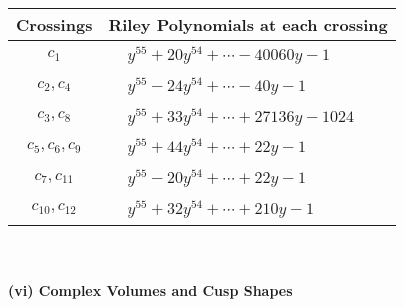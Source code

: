 \documentclass[1p]{elsarticle_modified}
\theoremstyle{definition}
\begin{document}
\begin{tabular}{m{50pt}|m{274pt}}
Crossings & \hspace{64pt}Riley Polynomials at each crossing \\
\hline $$\begin{aligned}c_{1}\end{aligned}$$&$\begin{aligned}
&y^{55}+20 y^{54}+\cdots-40060 y-1
\end{aligned}$\\
\hline $$\begin{aligned}c_{2},c_{4}\end{aligned}$$&$\begin{aligned}
&y^{55}-24 y^{54}+\cdots-40 y-1
\end{aligned}$\\
\hline $$\begin{aligned}c_{3},c_{8}\end{aligned}$$&$\begin{aligned}
&y^{55}+33 y^{54}+\cdots+27136 y-1024
\end{aligned}$\\
\hline $$\begin{aligned}c_{5},c_{6},c_{9}\end{aligned}$$&$\begin{aligned}
&y^{55}+44 y^{54}+\cdots+22 y-1
\end{aligned}$\\
\hline $$\begin{aligned}c_{7},c_{11}\end{aligned}$$&$\begin{aligned}
&y^{55}-20 y^{54}+\cdots+22 y-1
\end{aligned}$\\
\hline $$\begin{aligned}c_{10},c_{12}\end{aligned}$$&$\begin{aligned}
&y^{55}+32 y^{54}+\cdots+210 y-1
\end{aligned}$\\
\hline
\end{tabular}\\~\\
\newpage\flushleft \textbf{(vi) Complex Volumes and Cusp Shapes}
\end{document}
